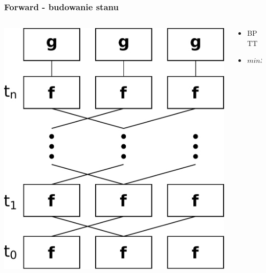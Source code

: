 \documentclass{beamer}
\begin{document}
\begin{frame}
\frametitle{Forward - budowanie stanu}
\begin{columns}
	\begin{column}{0.66\textwidth}
		\includegraphics[scale=0.4]{img/forward}
	\end{column}
	\begin{column}{0.34\textwidth}
		\begin{itemize}
			\item BPTT
			\item $minStateDiff$
		\end{itemize}
	\end{column}
\end{columns}
\end{frame}
\end{document}
